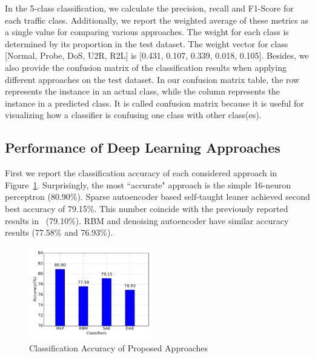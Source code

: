 In the 5-class classification, we calculate the precision, recall and F1-Score for each traffic class.
Additionally, we report the weighted average of these metrics as a single value for comparing various approaches.
The weight for each class is determined by its proportion in the test dataset.
The weight vector for class [Normal, Probe, DoS, U2R, R2L] is [0.431, 0.107, 0.339, 0.018, 0.105].
Besides, we also provide the confusion matrix of the classification results when applying
different approaches on the test dataset.
In our confusion matrix table, the row represents the instance in an actual class,
while the column represents the instance in a predicted class.
It is called confusion matrix because it is useful for visualizing how a classifier
is confusing one class with other class(es).


\subsection{Performance of Deep Learning Approaches}
First we report the classification accuracy of each considered approach in Figure~\ref{Fig:CompAccuracy}.
Surprisingly, the most ``accurate" approach is the simple 16-neuron perceptron (80.90\%).
Sparse autoencoder based self-taught leaner achieved second best accuracy of 79.15\%.
This number coincide with the previously reported results in~\cite{STL-NIDS} (79.10\%).
RBM and denoising autoencoder have similar accuracy results (77.58\% and 76.93\%).

\begin{figure}[h]
    \centering
    \includegraphics[width=0.48\textwidth]{figures/comp_accuracy.pdf}
    \caption{Classification Accuracy of Proposed Approaches}
    \label{Fig:CompAccuracy}
\end{figure}

